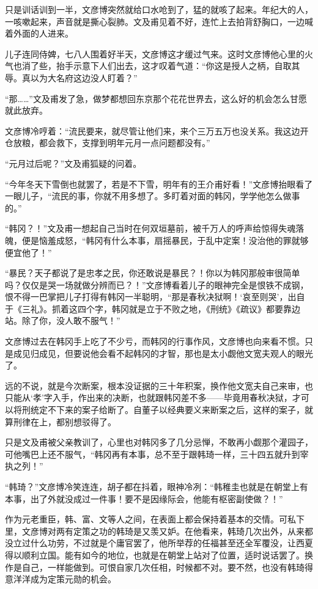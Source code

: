 只是训话训到一半，文彦博突然就给口水呛到了，猛的就咳了起来。年纪大的人，一咳嗽起来，声音就是撕心裂肺。文及甫见着不好，连忙上去拍背舒胸口，一边喊着外面的人进来。

儿子连同侍婢，七八人围着好半天，文彦博这才缓过气来。这时文彦博他心里的火气也消了些，抬手示意下人们出去，这才叹着气道：“你这是授人之柄，自取其辱。真以为大名府这边没人盯着？”

“那……”文及甫发了急，做梦都想回东京那个花花世界去，这么好的机会怎么甘愿就此放弃。

文彦博冷哼着：“流民要来，就尽管让他们来，来个三万五万也没关系。我这边开仓放粮，都会救下，支撑到明年元月一点问题都没有。”

“元月过后呢？”文及甫狐疑的问着。

“今年冬天下雪倒也就罢了，若是不下雪，明年有的王介甫好看！”文彦博抬眼看了一眼儿子，“流民的事，你就不用多想了。多盯着对面的韩冈，学学他怎么做事的。”

“韩冈？！”文及甫一想起自己当时在何双垣墓前，被千万人的呼声给惊得失魂落魄，便是恼羞成怒，“韩冈有什么本事，扇摇暴民，于乱中定案！没治他的罪就够便宜他了！”

“暴民？天子都说了是忠孝之民，你还敢说是暴民？！你以为韩冈那般审很简单吗？仅仅是哭一场就做分辨而已？！”文彦博看着儿子的眼神完全是恨铁不成钢，恨不得一巴掌把儿子打得有韩冈一半聪明，“那是春秋决狱啊！‘哀至则哭’，出自于《三礼》。抓着这四个字，韩冈就是立于不败之地，《刑统》《疏议》都要靠边站。除了你，没人敢不服气！”

文彦博过去在韩冈手上吃了不少亏，而韩冈的行事作风，文彦博也向来看不惯。只是成见归成见，但要说他会看不起韩冈的才智，那也是太小觑他文宽夫观人的眼光了。

远的不说，就是今次断案，根本没证据的三十年积案，换作他文宽夫自己来审，也只能从‘孝’字入手，作出来的决断，也就跟韩冈差不多——毕竟用春秋决狱，才可以将刑统定不下来的案子给断了。自董子以经典要义来断案之后，这样的案子，就算刑律在上，都别想驳得了。

只是文及甫被父亲教训了，心里也对韩冈多了几分忌惮，不敢再小觑那个灌园子，可他嘴巴上还不服气，“韩冈再有本事，总不至于跟韩琦一样，三十四五就升到宰执之列！”

“韩琦？”文彦博冷笑连连，胡子都在抖着，眼神冷冽：“韩稚圭也就是在朝堂上有本事，出了外就没成过一件事！要不是因缘际会，他能有枢密副使做？！”

作为元老重臣，韩、富、文等人之间，在表面上都会保持着基本的交情。可私下里，文彦博对两有定策之功的韩琦是又羡又妒。在他看来，韩琦几次出外，从来都没立过什么功劳，不过就是个庸官罢了，他所举荐的任福甚至还全军覆没，让西夏得以顺利立国。能有如今的地位，也就是在朝堂上站对了位置，适时说话罢了。换作是自己，一样能做到。可恨自家几次任相，时候都不对。要不然，也没有韩琦得意洋洋成为定策元勋的机会。

